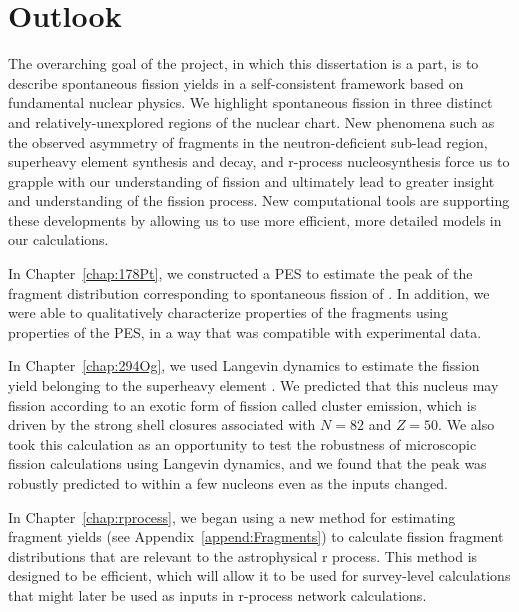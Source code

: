 \chapter{Outlook}\label{chap:Outlook}

The overarching goal of the project, in which this dissertation is a part, is to describe spontaneous fission yields in a self-consistent framework based on fundamental nuclear physics. We highlight spontaneous fission in three distinct and relatively-unexplored regions of the nuclear chart. New phenomena such as the observed asymmetry of fragments in the neutron-deficient sub-lead region, superheavy element synthesis and decay, and r-process nucleosynthesis force us to grapple with our understanding of fission and ultimately lead to greater insight and understanding of the fission process. New computational tools are supporting these developments by allowing us to use more efficient, more detailed models in our calculations.

In Chapter~\ref{chap:178Pt}, we constructed a PES to estimate the peak of the fragment distribution corresponding to spontaneous fission of {\Pt}. In addition, we were able to qualitatively characterize properties of the fragments using properties of the PES, in a way that was compatible with experimental data.

In Chapter~\ref{chap:294Og}, we used Langevin dynamics to estimate the fission yield belonging to the superheavy element {\Og}. We predicted that this nucleus may fission according to an exotic form of fission called cluster emission, which is driven by the strong shell closures associated with $N=82$ and $Z=50$. We also took this calculation as an opportunity to test the robustness of microscopic fission calculations using Langevin dynamics, and we found that the peak was robustly predicted to within a few nucleons even as the inputs changed.

In Chapter~\ref{chap:rprocess}, we began using a new method for estimating fragment yields (see Appendix~\ref{append:Fragments}) to calculate fission fragment distributions that are relevant to the astrophysical r process. This method is designed to be efficient, which will allow it to be used for survey-level calculations that might later be used as inputs in r-process network calculations.

